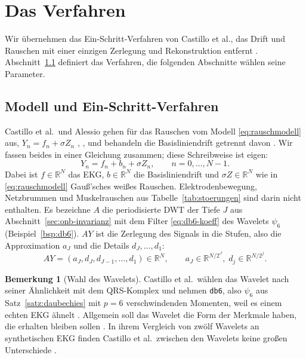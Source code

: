 \documentclass[a4paper,11pt,bibliography=totoc,listof=totoc,headinclude=true,cleardoublepage=empty,oneside]{scrbook}
\theoremstyle{plain}
\theoremstyle{definition}
\newtheorem{Bemerkung}[Satz]{Bemerkung}
\newcommand{\R}{\mathbb{R}}
\begin{document}
\section{Das Verfahren}
\label{sec:verfahren}

Wir übernehmen das Ein-Schritt-Verfahren von Castillo et al., das Drift und
Rauschen mit einer einzigen Zerlegung und Rekonstruktion entfernt
\cite[Abschn.~3]{castillo}. %
Abschnitt~\ref{sec:ein-schritt} definiert das Verfahren, die folgenden
Abschnitte wählen seine Parameter.

\subsection{Modell und Ein-Schritt-Verfahren}
\label{sec:ein-schritt}

Castillo et al.\ und Alessio gehen für das Rauschen vom Modell
\eqref{eq:rauschmodell} aus, $Y_n = f_n + \sigma Z_n$
\cite[Abschn.~2.2.2, Gl.~(8)]{castillo}, %
\cite[Kap.~15.2.1]{alessio}, %
und behandeln die Basisliniendrift getrennt davon \cite[Abschn.~2.2.1]{castillo}. %
Wir fassen beides in einer Gleichung zusammen; diese Schreibweise ist eigen:
\begin{equation}
\label{eq:modell-ekg}
  Y_n = f_n + b_n + \sigma Z_n, \qquad n = 0,\dots,N-1 .
\end{equation}
Dabei ist $f\in\R^N$ das EKG, $b\in\R^N$ die Basisliniendrift und
$\sigma Z\in\R^N$ wie in \eqref{eq:rauschmodell} Gau\ss'sches wei\ss es
Rauschen.
Elektrodenbewegung, Netzbrummen und Muskelrauschen aus
Tabelle~\ref{tab:stoerungen} sind darin nicht enthalten.
Es bezeichne $A$ die periodisierte DWT der Tiefe $J$ aus
Abschnitt~\ref{sec:onb-invarianz} mit dem Filter \eqref{eq:db6-koeff} des
Wavelets $\psi_6$ (Beispiel~\ref{bsp:db6}). $AY$ ist die Zerlegung des
Signals in die Stufen, also die Approximation $a_J$ und die Details
$d_J, \dots, d_1$:
\[
  AY = (a_J, d_J, d_{J-1}, \dots, d_1) \in \R^N, \qquad
  a_J \in \R^{N/2^J},\; d_j \in \R^{N/2^j}.
\]

\begin{Bemerkung}[Wahl des Wavelets]
Castillo et al.\ wählen das Wavelet nach seiner Ähnlichkeit mit dem
QRS-Komplex und nehmen \texttt{db6}, also $\psi_6$ aus
Satz~\ref{satz:daubechies} mit $p = 6$ verschwindenden Momenten, weil es
einem echten EKG ähnelt \cite[Abschn.~3.1.1]{castillo}. %
Allgemein soll das Wavelet die Form der Merkmale haben, die erhalten bleiben
sollen \cite[Kap.~15.2.1]{alessio}. %
In ihrem Vergleich von zwölf Wavelets an synthetischen EKG finden Castillo
et al.\ zwischen den Wavelets keine gro\ss en Unterschiede
\cite[Abschn.~4, Tab.~2]{castillo}. %
\end{Bemerkung}
\end{document}
